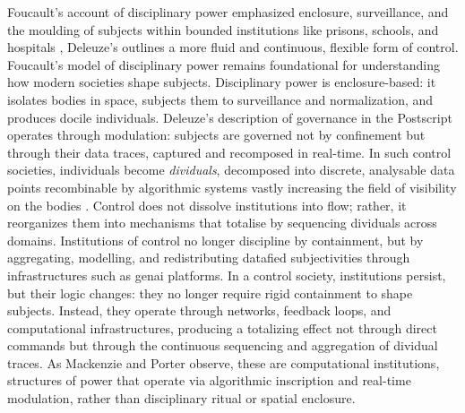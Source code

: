 Foucault’s account of disciplinary power emphasized enclosure, surveillance, and the moulding of subjects within bounded institutions like prisons, schools, and hospitals \parencite{foucault2008}, Deleuze's  outlines a more fluid and continuous, flexible form of control. Foucault’s model of disciplinary power remains foundational for understanding how modern societies shape subjects. Disciplinary power is enclosure-based: it isolates bodies in space, subjects them to surveillance and normalization, and produces docile individuals. Deleuze's description of governance in the Postscript operates through modulation: subjects are governed not by confinement but through their data traces, captured and recomposed in real-time.
In such control societies, individuals become \emph{dividuals}, decomposed into discrete, analysable data points recombinable by algorithmic systems \parencite{mackenzie2021} vastly increasing the field of visibility on the bodies \parencite{foucault2008}. Control does not dissolve institutions into flow; rather, it reorganizes them into mechanisms that totalise by sequencing dividuals across domains. Institutions of control no longer discipline by containment, but by aggregating, modelling, and redistributing datafied subjectivities through infrastructures such as \gls{genai} platforms. In a control society, institutions persist, but their logic changes: they no longer require rigid containment to shape subjects. Instead, they operate through networks, feedback loops, and computational infrastructures, producing a totalizing effect not through direct commands but through the continuous sequencing and aggregation of dividual traces. As Mackenzie and Porter \parencite*[]{mackenzie2021} observe, these are computational institutions, structures of power that operate via algorithmic inscription and real-time modulation, rather than disciplinary ritual or spatial enclosure.



